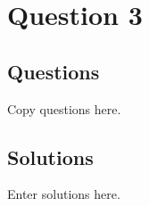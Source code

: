 \chapter{Question 3}
\section{Questions}
Copy questions here.

\section{Solutions}
Enter solutions here.
